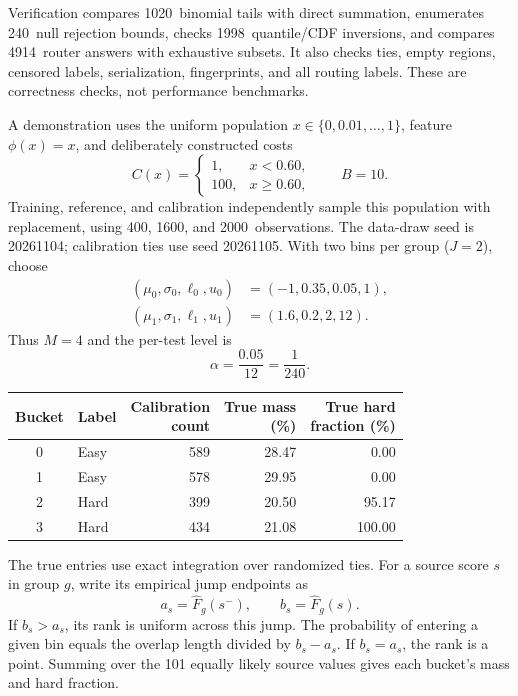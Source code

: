 \documentclass[10pt,letterpaper]{article}
\newcommand{\TailChecks}{1020}
\newcommand{\NullChecks}{240}
\newcommand{\QuantileChecks}{1998}
\newcommand{\RouterChecks}{4914}
\newcommand{\TrainCount}{400}
\newcommand{\ReferenceCount}{1600}
\newcommand{\CalibrationCount}{2000}
\newcommand{\MassZero}{28.47}
\newcommand{\MassOne}{29.95}
\newcommand{\MassTwo}{20.50}
\newcommand{\MassThree}{21.08}
\newcommand{\PurityZero}{0.00}
\newcommand{\PurityOne}{0.00}
\newcommand{\PurityTwo}{95.17}
\newcommand{\PurityThree}{100.00}
\newcommand{\CountZero}{589}
\newcommand{\CountOne}{578}
\newcommand{\CountTwo}{399}
\newcommand{\CountThree}{434}
\begin{document}
Verification compares \TailChecks\ binomial tails with direct summation, enumerates \NullChecks\ null rejection bounds, checks \QuantileChecks\ quantile/CDF inversions, and compares \RouterChecks\ router answers with exhaustive subsets. It also checks ties, empty regions, censored labels, serialization, fingerprints, and all routing labels. These are correctness checks, not performance benchmarks.

A demonstration uses the uniform population $x\in\{0,0.01,\ldots,1\}$, feature $\phi(x)=x$, and deliberately constructed costs
\begin{equation}
 C(x)=\begin{cases}1,&x<0.60,\\100,&x\ge0.60,\end{cases}
 \qquad B=10.
\end{equation}
Training, reference, and calibration independently sample this population with replacement, using \TrainCount, \ReferenceCount, and \CalibrationCount\ observations. The data-draw seed is 20261104; calibration ties use seed 20261105. With two bins per group ($J=2$), choose
\[
 \begin{aligned}
 (\mu_0,\sigma_0,\ell_0,u_0)&=(-1,0.35,0.05,1),\\
 (\mu_1,\sigma_1,\ell_1,u_1)&=(1.6,0.2,2,12).
 \end{aligned}
\]
Thus $M=4$ and the per-test level is
\[
 \alpha=\frac{0.05}{12}=\frac1{240}.
\]

\begin{center}
\begin{tabular}{@{}clrrr@{}}
\toprule
Bucket & Label & \shortstack{Calibration\\count} & \shortstack{True mass\\(\%)} & \shortstack{True hard\\fraction (\%)}\\
\midrule
0 & Easy & \CountZero & \MassZero & \PurityZero\\
1 & Easy & \CountOne & \MassOne & \PurityOne\\
2 & Hard & \CountTwo & \MassTwo & \PurityTwo\\
3 & Hard & \CountThree & \MassThree & \PurityThree\\
\bottomrule
\end{tabular}
\end{center}
The true entries use exact integration over randomized ties. For a source score $s$ in group $g$, write its empirical jump endpoints as
\[
 a_s=\widehat F_g(s^-),\qquad b_s=\widehat F_g(s).
\]
If $b_s>a_s$, its rank is uniform across this jump. The probability of entering a given bin equals the overlap length divided by $b_s-a_s$. If $b_s=a_s$, the rank is a point. Summing over the 101 equally likely source values gives each bucket's mass and hard fraction.
\end{document}
